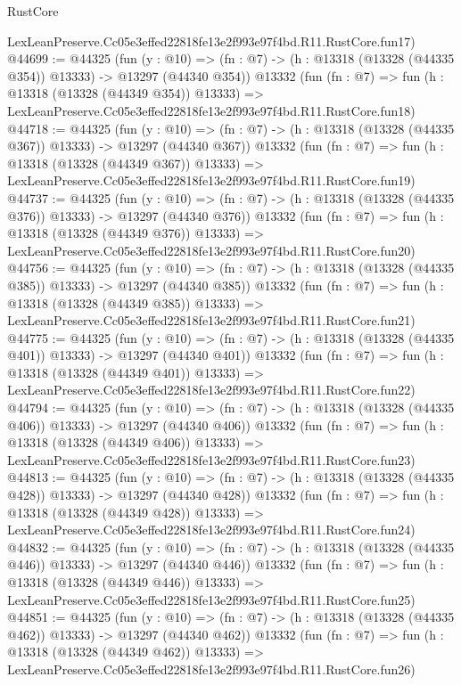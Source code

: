 \begin{lexlean}{RustCore}
\begin{coremodule}
    LexLeanPreserve.Cc05e3effed22818fe13e2f993e97f4bd.R11.RustCore.fun17)
@44699 := @44325
    (fun (y : @10) =>
    (fn : @7) -> (h : @13318 (@13328 (@44335 @354)) @13333) -> @13297 (@44340 @354))
    @13332
    (fun (fn : @7) =>
    fun (h : @13318 (@13328 (@44349 @354)) @13333) =>
    LexLeanPreserve.Cc05e3effed22818fe13e2f993e97f4bd.R11.RustCore.fun18)
@44718 := @44325
    (fun (y : @10) =>
    (fn : @7) -> (h : @13318 (@13328 (@44335 @367)) @13333) -> @13297 (@44340 @367))
    @13332
    (fun (fn : @7) =>
    fun (h : @13318 (@13328 (@44349 @367)) @13333) =>
    LexLeanPreserve.Cc05e3effed22818fe13e2f993e97f4bd.R11.RustCore.fun19)
@44737 := @44325
    (fun (y : @10) =>
    (fn : @7) -> (h : @13318 (@13328 (@44335 @376)) @13333) -> @13297 (@44340 @376))
    @13332
    (fun (fn : @7) =>
    fun (h : @13318 (@13328 (@44349 @376)) @13333) =>
    LexLeanPreserve.Cc05e3effed22818fe13e2f993e97f4bd.R11.RustCore.fun20)
@44756 := @44325
    (fun (y : @10) =>
    (fn : @7) -> (h : @13318 (@13328 (@44335 @385)) @13333) -> @13297 (@44340 @385))
    @13332
    (fun (fn : @7) =>
    fun (h : @13318 (@13328 (@44349 @385)) @13333) =>
    LexLeanPreserve.Cc05e3effed22818fe13e2f993e97f4bd.R11.RustCore.fun21)
@44775 := @44325
    (fun (y : @10) =>
    (fn : @7) -> (h : @13318 (@13328 (@44335 @401)) @13333) -> @13297 (@44340 @401))
    @13332
    (fun (fn : @7) =>
    fun (h : @13318 (@13328 (@44349 @401)) @13333) =>
    LexLeanPreserve.Cc05e3effed22818fe13e2f993e97f4bd.R11.RustCore.fun22)
@44794 := @44325
    (fun (y : @10) =>
    (fn : @7) -> (h : @13318 (@13328 (@44335 @406)) @13333) -> @13297 (@44340 @406))
    @13332
    (fun (fn : @7) =>
    fun (h : @13318 (@13328 (@44349 @406)) @13333) =>
    LexLeanPreserve.Cc05e3effed22818fe13e2f993e97f4bd.R11.RustCore.fun23)
@44813 := @44325
    (fun (y : @10) =>
    (fn : @7) -> (h : @13318 (@13328 (@44335 @428)) @13333) -> @13297 (@44340 @428))
    @13332
    (fun (fn : @7) =>
    fun (h : @13318 (@13328 (@44349 @428)) @13333) =>
    LexLeanPreserve.Cc05e3effed22818fe13e2f993e97f4bd.R11.RustCore.fun24)
@44832 := @44325
    (fun (y : @10) =>
    (fn : @7) -> (h : @13318 (@13328 (@44335 @446)) @13333) -> @13297 (@44340 @446))
    @13332
    (fun (fn : @7) =>
    fun (h : @13318 (@13328 (@44349 @446)) @13333) =>
    LexLeanPreserve.Cc05e3effed22818fe13e2f993e97f4bd.R11.RustCore.fun25)
@44851 := @44325
    (fun (y : @10) =>
    (fn : @7) -> (h : @13318 (@13328 (@44335 @462)) @13333) -> @13297 (@44340 @462))
    @13332
    (fun (fn : @7) =>
    fun (h : @13318 (@13328 (@44349 @462)) @13333) =>
    LexLeanPreserve.Cc05e3effed22818fe13e2f993e97f4bd.R11.RustCore.fun26)

\end{coremodule}
\end{lexlean}
